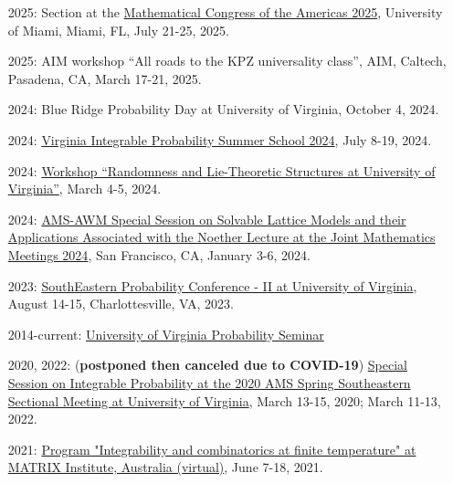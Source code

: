 \documentclass[letterpaper,11pt]{article}
\begin{document}
\begin{itemize}
	\item [2025:]
	Section at the
	\href{https://www.math.miami.edu/mca/}{Mathematical Congress of the Americas 2025},
	University of Miami,
	Miami, FL,
	July 21-25, 2025.

	\item [2025:]
	AIM workshop
	``All roads to the KPZ universality class'',
	AIM, Caltech, Pasadena, CA, March 17-21, 2025.

	\item [2024:]
	Blue Ridge Probability Day at University of Virginia,
	October 4, 2024.

	\item [2024:]
	\href{https://lpetrov.cc/vipss2024/}{Virginia Integrable Probability Summer School 2024},
	July 8-19, 2024.

	\item [2024:]
	\href{https://math.virginia.edu/random-lie-2024/}{Workshop ``Randomness and Lie-Theoretic Structures at University of Virginia''},
	March 4-5, 2024.

	\item [2024:]
\href{https://www.jointmathematicsmeetings.org/meetings/national/jmm2024/2300_program_ss43.html}{AMS-AWM Special Session on Solvable Lattice Models and their Applications Associated with the Noether Lecture at the Joint Mathematics Meetings 2024},
San Francisco, CA, January 3-6, 2024.

\item [2023:]
\href{https://sites.google.com/view/sepc2023ii/sepc-2023-ii}{SouthEastern Probability Conference - II at University of Virginia},
August 14-15, Charlottesville, VA, 2023.

\item [2014-current:]
\href{http://math.virginia.edu/seminars/probability/}{University of Virginia Probability Seminar}

\item [2020, 2022:]
(\textbf{postponed then canceled due to COVID-19})
\href{http://www.ams.org/meetings/sectional/2273_program.html}{Special Session on Integrable Probability at the 2020 AMS Spring Southeastern Sectional Meeting at University of Virginia},
March 13-15, 2020; March 11-13, 2022.

\item [2021:]
\href{https://www.matrix-inst.org.au/events/integrability-and-combinatorics-at-finite-temperature/}{Program "Integrability and combinatorics at finite temperature" at MATRIX Institute, Australia (virtual)},
June 7-18, 2021.


\end{itemize}
\end{document}
